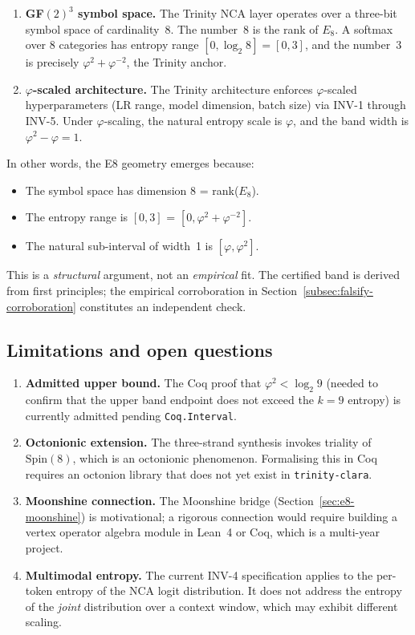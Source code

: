 \begin{enumerate}
  \item \textbf{GF\((2)^3\) symbol space.} The Trinity NCA layer
    operates over a three-bit symbol space of cardinality~8.  The
    number~8 is the rank of \(E_8\).  A softmax over 8 categories
    has entropy range \([0, \log_2 8] = [0, 3]\), and the number~3
    is precisely \(\varphi^2 + \varphi^{-2}\), the Trinity anchor.
  \item \textbf{\(\varphi\)-scaled architecture.} The Trinity
    architecture enforces \(\varphi\)-scaled hyperparameters (LR
    range, model dimension, batch size) via INV-1 through INV-5.
    Under \(\varphi\)-scaling, the natural entropy scale is
    \(\varphi\), and the band width is \(\varphi^2 - \varphi = 1\).
\end{enumerate}

In other words, the E8 geometry emerges because:
\begin{itemize}
  \item The symbol space has dimension 8 = rank(\(E_8\)).
  \item The entropy range is \([0, 3]\) = \([0, \varphi^2 + \varphi^{-2}]\).
  \item The natural sub-interval of width~1 is \([\varphi, \varphi^2]\).
\end{itemize}

This is a \emph{structural} argument, not an \emph{empirical} fit.
The certified band is derived from first principles; the empirical
corroboration in Section~\ref{subsec:falsify-corroboration}
constitutes an independent check.

\subsection{Limitations and open questions}
\label{subsec:discussion-limits}

\begin{enumerate}
  \item \textbf{Admitted upper bound.}  The Coq proof that
    \(\varphi^2 < \log_2 9\) (needed to confirm that the upper
    band endpoint does not exceed the \(k=9\) entropy) is currently
    admitted pending \texttt{Coq.Interval}.
  \item \textbf{Octonionic extension.}  The three-strand synthesis
    invokes triality of \(\mathrm{Spin}(8)\), which is an octonionic
    phenomenon.  Formalising this in Coq requires an octonion library
    that does not yet exist in \texttt{trinity-clara}.
  \item \textbf{Moonshine connection.}  The Moonshine bridge
    (Section~\ref{sec:e8-moonshine}) is motivational; a rigorous
    connection would require building a vertex operator algebra
    module in Lean~4 or Coq, which is a multi-year project.
  \item \textbf{Multimodal entropy.}  The current INV-4 specification
    applies to the per-token entropy of the NCA logit distribution.
    It does not address the entropy of the \emph{joint} distribution
    over a context window, which may exhibit different scaling.
\end{enumerate}

